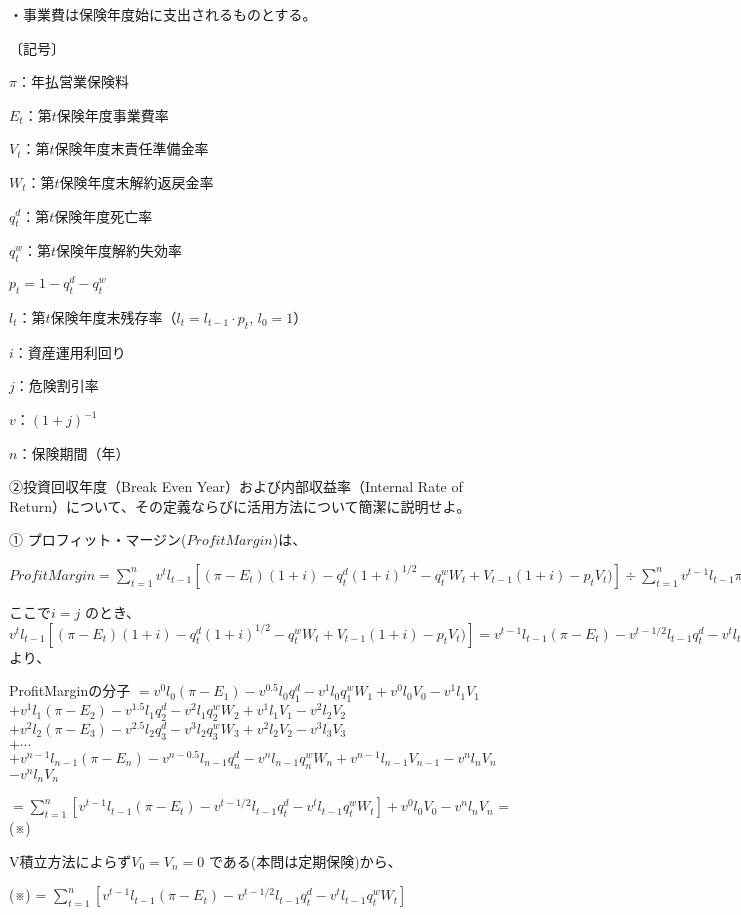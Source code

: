 \documentclass[report,gutter=10mm,fore-edge=10mm,uplatex,dvipdfmx]{jlreq}
\begin{document}
・事業費は保険年度始に支出されるものとする。

〔記号〕

$\pi$：年払営業保険料

$E_t$：第$t$保険年度事業費率

$V_t$：第$t$保険年度末責任準備金率

$W_t$：第$t$保険年度末解約返戻金率

$q_t^d$：第$t$保険年度死亡率

$q_t^w$：第$t$保険年度解約失効率

$p_t = 1  - q_t^d - q_t^w$

$l_t$：第$t$保険年度末残存率（$l_t=l_{t-1}\cdot p_t$, $l_0=1$）

$i$：資産運用利回り

$j$：危険割引率

$v$：$(1+j)^{-1}$

$n$：保険期間（年）

②投資回収年度（Break Even Year）および内部収益率（Internal Rate of Return）について、その定義ならびに活用方法について簡潔に説明せよ。
\answer{}

①
プロフィット・マージン($ProfitMargin$)は、

$ProfitMargin = \sum^n_{t=1} v^t l_{t-1}[(\pi-E_t)(1+i)-q_t^d(1+i)^{1/2}-q_t^wW_t+V_{t-1}(1+i)-p_tV_t)]\div \sum^n_{t=1}v^{t-1}l_{t-1}\pi$

ここで$i=j$ のとき、
$v^t l_{t-1}[(\pi-E_t)(1+i)-q_t^d(1+i)^{1/2}-q_t^wW_t+V_{t-1}(1+i)-p_tV_t)]
= v^{t-1}l_{t-1}(\pi-E_t) - v^{t-1/2}l_{t-1}q_t^d - v^tl_{t-1}q_t^w W_t + v^{t-1}l_{t-1}V_{t-1} - v^tl_tV_t$
より、

ProfitMarginの分子
$=v^0l_0(\pi-E_1)-v^{0.5}l_0q_1^d - v^1l_0q_1^wW_1 + v^0l_0V_0 - v^1l_1V_1$\\
$+v^1l_1(\pi-E_2)-v^{1.5}l_1q_2^d - v^2l_1q_2^wW_2 + v^1l_1V_1 - v^2l_2V_2$\\
$+v^2l_2(\pi-E_3)-v^{2.5}l_2q_3^d - v^3l_2q_3^wW_3 + v^2l_2V_2 - v^3l_3V_3$\\
$+\cdots$\\
$+v^{n-1}l_{n-1}(\pi-E_{n})-v^{n-0.5}l_{n-1}q_{n}^d - v^{n}l_{n-1}q_{n}^wW_{n} + v^{n-1}l_{n-1}V_{n-1} - v^{n}l_{n}V_{n}$
$-v^nl_nV_n$

$= \sum^n_{t=1}[v^{t-1}l_{t-1}(\pi-E_t)-v^{t-1/2}l_{t-1}q_t^d-v^tl_{t-1}q_t^wW_t] + v^0l_0V_0 - v^nl_nV_n$  = (※)

V積立方法によらず$V_0=V_n=0$ である(本問は定期保険)から、

(※) = $ \sum^n_{t=1}[v^{t-1}l_{t-1}(\pi-E_t)-v^{t-1/2}l_{t-1}q_t^d-v^tl_{t-1}q_t^wW_t]$
\end{document}
